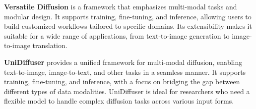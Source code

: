 
\textbf{Versatile Diffusion} is a framework that emphasizes multi-modal tasks and modular design. It supports training, fine-tuning, and inference, allowing users to build customized workflows tailored to specific domains. Its extensibility makes it suitable for a wide range of applications, from text-to-image generation to image-to-image translation.

\textbf{UniDiffuser} provides a unified framework for multi-modal diffusion, enabling text-to-image, image-to-text, and other tasks in a seamless manner. It supports training, fine-tuning, and inference, with a focus on bridging the gap between different types of data modalities. UniDiffuser is ideal for researchers who need a flexible model to handle complex diffusion tasks across various input forms.